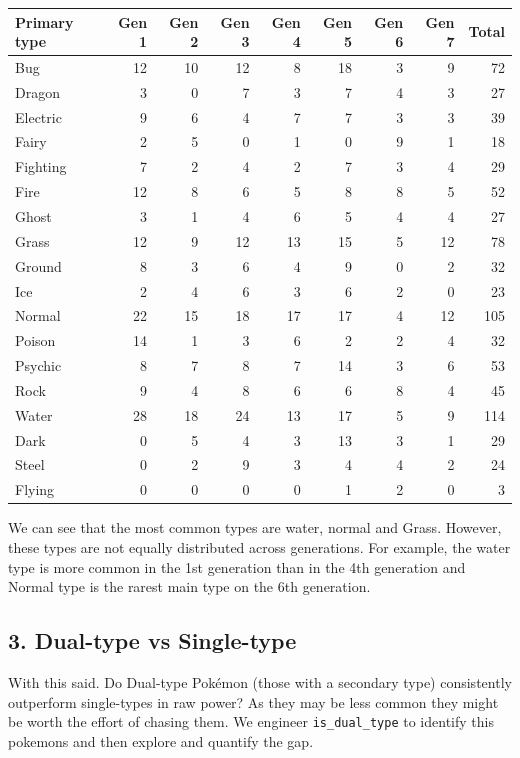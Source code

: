 \documentclass[
]{article}
\begin{document}
\begin{longtable}[t]{lrrrrrrrr}
\toprule
Primary type & Gen 1 & Gen 2 & Gen 3 & Gen 4 & Gen 5 & Gen 6 & Gen 7 & Total\\
\midrule
Bug & 12 & 10 & 12 & 8 & 18 & 3 & 9 & 72\\
Dragon & 3 & 0 & 7 & 3 & 7 & 4 & 3 & 27\\
Electric & 9 & 6 & 4 & 7 & 7 & 3 & 3 & 39\\
Fairy & 2 & 5 & 0 & 1 & 0 & 9 & 1 & 18\\
Fighting & 7 & 2 & 4 & 2 & 7 & 3 & 4 & 29\\
\addlinespace
Fire & 12 & 8 & 6 & 5 & 8 & 8 & 5 & 52\\
Ghost & 3 & 1 & 4 & 6 & 5 & 4 & 4 & 27\\
Grass & 12 & 9 & 12 & 13 & 15 & 5 & 12 & 78\\
Ground & 8 & 3 & 6 & 4 & 9 & 0 & 2 & 32\\
Ice & 2 & 4 & 6 & 3 & 6 & 2 & 0 & 23\\
\addlinespace
Normal & 22 & 15 & 18 & 17 & 17 & 4 & 12 & 105\\
Poison & 14 & 1 & 3 & 6 & 2 & 2 & 4 & 32\\
Psychic & 8 & 7 & 8 & 7 & 14 & 3 & 6 & 53\\
Rock & 9 & 4 & 8 & 6 & 6 & 8 & 4 & 45\\
Water & 28 & 18 & 24 & 13 & 17 & 5 & 9 & 114\\
\addlinespace
Dark & 0 & 5 & 4 & 3 & 13 & 3 & 1 & 29\\
Steel & 0 & 2 & 9 & 3 & 4 & 4 & 2 & 24\\
Flying & 0 & 0 & 0 & 0 & 1 & 2 & 0 & 3\\
\bottomrule
\end{longtable}

We can see that the most common types are water, normal and Grass.
However, these types are not equally distributed across generations. For
example, the water type is more common in the 1st generation than in the
4th generation and Normal type is the rarest main type on the 6th
generation.

\subsection{3. Dual-type vs Single-type}\label{dual-type-vs-single-type}

With this said. Do Dual-type Pokémon (those with a secondary type)
consistently outperform single-types in raw power? As they may be less
common they might be worth the effort of chasing them. We engineer
\texttt{is\_dual\_type} to identify this pokemons and then explore and
quantify the gap.
\end{document}
